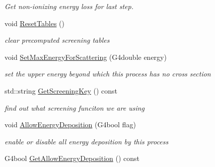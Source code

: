 \begin{DoxyCompactItemize}
\begin{DoxyCompactList}\small\item\em Get non-\/ionizing energy loss for last step. \end{DoxyCompactList}\item 
\hypertarget{classG4ScreenedNuclearRecoil_a18b5ff579de48e81e6fc001240aebdad}{void \hyperlink{classG4ScreenedNuclearRecoil_a18b5ff579de48e81e6fc001240aebdad}{Reset\-Tables} ()}\label{classG4ScreenedNuclearRecoil_a18b5ff579de48e81e6fc001240aebdad}

\begin{DoxyCompactList}\small\item\em clear precomputed screening tables \end{DoxyCompactList}\item 
void \hyperlink{classG4ScreenedNuclearRecoil_aff68cd261bf6f47ca064e226710faa33}{Set\-Max\-Energy\-For\-Scattering} (G4double energy)
\begin{DoxyCompactList}\small\item\em set the upper energy beyond which this process has no cross section \end{DoxyCompactList}\item 
\hypertarget{classG4ScreenedNuclearRecoil_a0d49c385b785d8b883e6b165ec4f34bc}{std\-::string \hyperlink{classG4ScreenedNuclearRecoil_a0d49c385b785d8b883e6b165ec4f34bc}{Get\-Screening\-Key} () const }\label{classG4ScreenedNuclearRecoil_a0d49c385b785d8b883e6b165ec4f34bc}

\begin{DoxyCompactList}\small\item\em find out what screening funciton we are using \end{DoxyCompactList}\item 
void \hyperlink{classG4ScreenedNuclearRecoil_ace84b594276d0b2b44350c1de6bfdb9e}{Allow\-Energy\-Deposition} (G4bool flag)
\begin{DoxyCompactList}\small\item\em enable or disable all energy deposition by this process \end{DoxyCompactList}\item 
\hypertarget{classG4ScreenedNuclearRecoil_abac8f36bad05cdcc18e309d6e7f4f627}{G4bool \hyperlink{classG4ScreenedNuclearRecoil_abac8f36bad05cdcc18e309d6e7f4f627}{Get\-Allow\-Energy\-Deposition} () const }\label{classG4ScreenedNuclearRecoil_abac8f36bad05cdcc18e309d6e7f4f627}


\end{DoxyCompactItemize}
